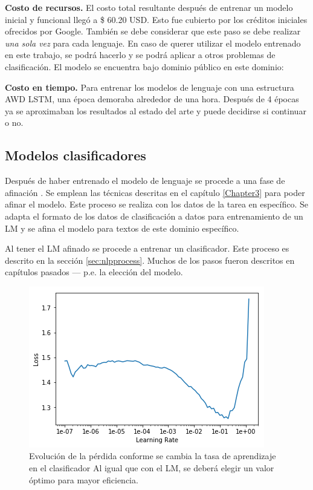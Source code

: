 \textbf{Costo de recursos.} El costo total resultante después de entrenar un modelo inicial y funcional llegó a \$ 60.20 USD. Esto fue cubierto por los créditos iniciales ofrecidos por Google. También se debe considerar que este paso se debe realizar \emph{una sola vez} para cada lenguaje. En caso de querer utilizar el modelo entrenado en este trabajo, se podrá hacerlo y se podrá aplicar a otros problemas de clasificación. El modelo se encuentra bajo dominio público en este dominio:

\textbf{Costo en tiempo.} Para entrenar los modelos de lenguaje con una estructura AWD LSTM, una época demoraba alrededor de una hora. Después de 4 épocas ya se aproximaban los resultados al estado del arte y puede decidirse si continuar o no.

\subsection{Modelos clasificadores}

Después de haber entrenado el modelo de lenguaje se procede a una fase de afinación \parencite{howard2018}. Se emplean las técnicas descritas en el capítulo \ref{Chapter3} para poder afinar el modelo. Este proceso se realiza con los datos de la tarea en específico. Se adapta el formato de los datos de clasificación a datos para entrenamiento de un LM y se afina el modelo para textos de este dominio específico.

Al tener el LM afinado se procede a entrenar un clasificador. Este proceso es descrito en la sección \ref{sec:nlpprocess}. Muchos de los pasos fueron descritos en capítulos pasados --- p.e. la elección del modelo.

\begin{figure}
\centering
\includegraphics[scale=1]{Figures/clas_lrfinder.png}
\caption{Evolución de la pérdida conforme se cambia la tasa de aprendizaje en el clasificador Al igual que con el LM, se deberá elegir un valor óptimo para mayor eficiencia.}
\label{fig:claslr}
\end{figure}

